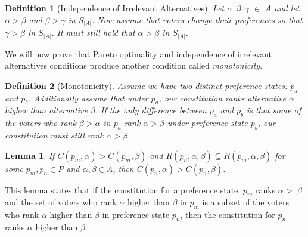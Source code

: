 \documentclass{amsart}
\newtheorem{definition}{Definition}
\newtheorem{lemma}{Lemma}
\theoremstyle{plain}
\begin{document}
\begin{definition} [Independence of Irrelevant Alternatives]
Let $\alpha, \beta, \gamma$ $\in$ $A$ and let $\alpha > \beta$ and $\beta > \gamma$ in $S_{|A|}$. Now assume that voters change their preferences so that $\gamma > \beta$ in $S_{|A|}$. It must still hold that $\alpha > \beta$ in $S_{|A|}$.  
\end{definition}

\noindent We will now prove that Pareto optimality and independence of irrelevant alternatives conditions produce another condition called \emph{monotonicity}.

\begin{definition}[Monotonicity]
Assume we have two distinct preference states: $p_a$ and $p_b$. Additionally assume that under $p_a$, our constitution ranks alternative $\alpha$ higher than alternative $\beta$. If the only difference between $p_a$ and $p_b$ is that some of the voters who rank $\beta > \alpha$ in $p_a$ rank $\alpha > \beta$ under preference state $p_b$, our constitution must still rank $\alpha > \beta$.
\end{definition}

\begin{lemma} If $C(p_m, \alpha) > C(p_m, \beta)$ and $R(p_n, \alpha, \beta) \subseteq R(p_m, \alpha, \beta)$ for some $p_m, p_n \in P$ and $\alpha, \beta \in A$, then $C(p_n, \alpha) > C(p_n, \beta)$.
\end{lemma}

\noindent This lemma states that if the constitution for a preference state, $p_m$ ranks $\alpha >$ $\beta$ and the set of voters who rank $\alpha$ higher than $\beta$ in $p_m$ is a subset of the voters who rank $\alpha$ higher than $\beta$ in preference state $p_n$, then the constitution for $p_n$ ranks $\alpha$ higher than $\beta$
\end{document}

